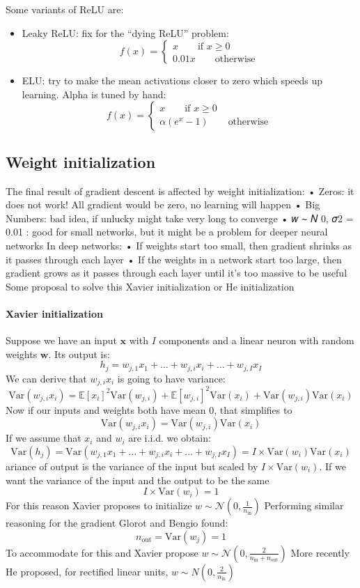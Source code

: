 Some variants of ReLU are: 
\begin{itemize}
    \item Leaky ReLU: fix for the “dying ReLU” problem: 
        \[f(x)=\begin{cases}
            x \qquad \text{if } x \geq 0 \\
            0.01x \qquad \text{otherwise}
        \end{cases}\]
    \item ELU: try to make the mean activations closer to zero which speeds up learning. 
        Alpha is tuned by hand: 
        \[f(x)=\begin{cases}
            x \qquad \text{if } x \geq 0 \\
            \alpha(e^x-1) \qquad \text{otherwise}
        \end{cases}\]
\end{itemize}

\subsection{Weight initialization}
The final result of gradient descent is affected by weight initialization:
• Zeros: it does not work! All gradient would be zero, no learning will happen
• Big Numbers: bad idea, if unlucky might take very long to converge
• 𝑤 ∼ 𝑁 0, 𝜎2 = 0.01 : good for small networks, but it might be a problem for
deeper neural networks
In deep networks:
• If weights start too small, then gradient shrinks as it passes through each layer
• If the weights in a network start too large, then gradient grows as it passes
through each layer until it’s too massive to be useful
Some proposal to solve this Xavier initialization or He initialization

\paragraph*{Xavier initialization}
Suppose we have an input $\mathbf{x}$ with $I$ components and a linear neuron with random weights $\mathbf{w}$. 
Its output is: 
\[h_j=w_{j,1}x_1+\dots+w_{j,i}x_i+\dots+w_{j,I}x_I\]
We can derive that $w_{j,i}x_i$ is going to have variance: 
\[\text{Var}(w_{j,i}x_i) = \mathbb{E}[x_i]^2\text{Var}(w_{j,i}) + \mathbb{E}[w_{j,i}]^2\text{Var}(x_i) + \text{Var}(w_{j,i})\text{Var}(x_i)\]
Now if our inputs and weights both have mean 0, that simplifies to
\[\text{Var}(w_{j,i}x_i)=\text{Var}(w_{j,i})\text{Var}(x_i)\]
If we assume that $x_i$ and $w_i$ are i.i.d. we obtain: 
\[\text{Var}(h_j)=\text{Var}(w_{j,1}x_1+\dots+w_{j,i}x_i+\dots+w_{j,I}x_I)=I\times\text{Var}(w_i)\text{Var}(x_i)\]
ariance of output is the variance of the input but scaled by $I\times\text{Var}(w_i)$.
If we want the variance of the input and the output to be the same
\[I\times\text{Var}(w_i)=1\]
For this reason Xavier proposes to initialize $w\sim \mathcal{N}\left(0,\frac{1}{n_{\text{in}}}\right)$
Performing similar reasoning for the gradient Glorot and Bengio found: 
\[n_{\text{out}}=\text{Var}(w_j)=1\]
To accommodate for this and Xavier propose $w\sim \mathcal{N}\left(0,\frac{2}{n_{\text{in}}+n_{\text{out}}}\right)$
More recently He proposed, for rectified linear units, $w\sim N\left(0,\frac{2}{n_{\text{in}}}\right)$

